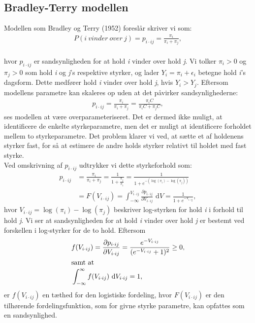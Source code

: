 \documentclass[11pt,a4paper]{article}
\begin{document}
\subsection{Bradley-Terry modellen}
Modellen som Bradley og Terry (1952)\cite{BradleyTerry} foreslår skriver vi som:
\begin{align*}
    P(i\ vinder\ over\ j) = p_{i\cdot ij} = \frac{\pi_i}{\pi_i+\pi_j},
\end{align*}
\\
hvor $p_{i\cdot ij}$ er sandsynligheden for at hold \textit{i} vinder over hold \textit{j}. Vi tolker $\pi_i>0$ og $\pi_j>0$ som hold \textit{i} og \textit{j}'s respektive styrker, og lader $Y_i=\pi_i+\epsilon_i$ betegne hold \textit{i}'s dagsform. Dette medfører hold \textit{i} vinder over hold \textit{j}, hvis $Y_i>Y_j$. 
Eftersom modellens parametre kan skaleres op uden at det påvirker sandsynlighederne:
\begin{align*}
p_{i\cdot ij} = \frac{\pi_i}{\pi_i+\pi_j} = \frac{\pi_iC}{\pi_iC+\pi_jC},
\end{align*}
ses modellen at være overparameteriseret. Det er dermed ikke muligt, at identificere de enkelte styrkeparametre, men det er muligt at identificere forholdet mellem to styrkeparametre. Det problem klarer vi ved, at sætte et af holdenens styrker fast, for så at estimere de andre holds styrker relativt til holdet med fast styrke.\\
Ved omskrivning af $p_{i\cdot ij}$ udtrykker vi dette styrkeforhold som:
\begin{align*}
    p_{i\cdot ij} &= \frac{\pi_i}{\pi_i+\pi_j}=\frac{1}{1+\frac{\pi_j}{\pi_i}}=\frac{1}{1+e^{-(\log(\pi_i)-\log(\pi_j))}}\\
    &=F(V_{i\cdot ij})=\int_{-\infty}^{V_{i\cdot ij}} \frac{\partial p_{i\cdot ij}}{\partial V_{i\cdot ij}} \text{ d}V=\frac{1}{1+e^{-V_{i\cdot ij}}},
\end{align*}
hvor $V_{i\cdot ij}=\log(\pi_i)-\log(\pi_j)$ beskriver log-styrken for hold \textit{i} i forhold til hold \textit{j}. Vi ser at sandsynligheden for at hold \textit{i} vinder over hold \textit{j} er bestemt ved forskellen i log-styrker for de to hold. Eftersom 
\begin{align*}
&f(V_{i\cdot ij})=\frac{\partial p_{i\cdot ij}}{\partial V_{i\cdot ij}} = \frac{e^{-V_{i\cdot ij}}}{(e^{-V_{i\cdot ij}}+1)^2} \geq 0, \\ 
\intertext{samt at}
&\int_{-\infty}^\infty f(V_{i\cdot ij}) \text{  d} V_{i\cdot ij} = 1,
\end{align*}
er $f(V_{i\cdot ij})$ en tæthed for den logistiske fordeling, hvor $F(V_{i\cdot ij})$ er den tilhørende fordelingsfunktion, som for givne styrke parametre, kan opfattes som en sandsynlighed.\\
\end{document}
